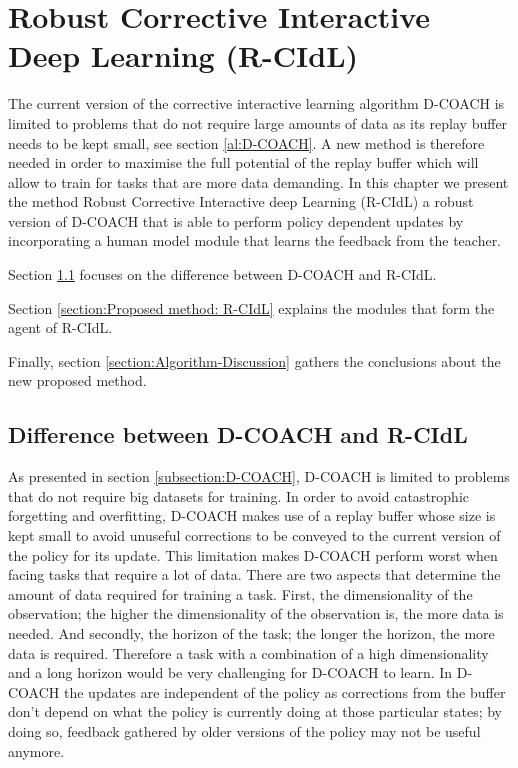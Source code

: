 \chapter{Robust Corrective Interactive Deep Learning (R-CIdL)}
\label{chapter:Proposed Method}



The current version of the corrective interactive learning algorithm D-COACH is limited to problems that do not require large amounts of data as its replay buffer needs to be kept small, see section \ref{al:D-COACH}. A new method is therefore needed in order to maximise the full potential of the replay buffer which will allow to train for tasks that are more data demanding. In this chapter we present the method Robust Corrective Interactive deep Learning (R-CIdL) a robust version of D-COACH that is able to perform policy dependent updates by incorporating a  human model module that learns the feedback from the teacher.

Section \ref{section:Difference between D-COACH and R-CIdL} focuses on the difference between D-COACH and R-CIdL.

Section \ref{section:Proposed method: R-CIdL} explains the modules that form the agent of R-CIdL.


Finally, section \ref{section:Algorithm-Discussion} gathers the conclusions about the new proposed method.  


\section{Difference between D-COACH and R-CIdL}
\label{section:Difference between D-COACH and R-CIdL}

As presented in section \ref{subsection:D-COACH}, D-COACH is limited to problems that do not require big datasets for training. In order to avoid catastrophic forgetting and overfitting, D-COACH makes use of a replay buffer whose size is kept small to avoid unuseful corrections to be conveyed to the current version of the policy for its update. This limitation makes  D-COACH perform worst when facing tasks that require a lot of data. There are two aspects that determine the amount of data required for training a task. First, the dimensionality of the observation;  the higher the dimensionality of the observation is, the more data is needed. And secondly, the horizon of the task; the longer the horizon, the more data is required. Therefore a task with a combination of a high dimensionality and a long horizon would be very challenging for D-COACH to learn. In D-COACH the updates are independent of the policy as corrections from the buffer don't depend on what the policy is currently doing at those particular states; by doing so, feedback gathered by older versions of the policy may not be useful anymore.



